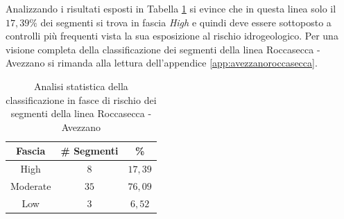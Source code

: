\newline
Analizzando i risultati esposti in Tabella \ref{percentualeavezzanoroccasecca} si evince che in questa linea solo il $17,39\%$ dei segmenti si trova in fascia \textit{High} e quindi deve essere sottoposto a controlli più frequenti vista la sua esposizione al rischio idrogeologico. 
Per una visione completa della classificazione dei segmenti della linea Roccasecca - Avezzano si rimanda alla lettura dell'appendice \ref{app:avezzanoroccasecca}.
\begin{table}[h]
\centering
\begin{tabular}{|c|c|c|}
\hline \rowcolor{lightgray}
Fascia   & \# Segmenti & \%    \\ \hline \rowcolor{flamingopink}
High     & $8$           & $17,39$     \\ \hline \rowcolor{icterine}
Moderate & $35$          & $76,09$ \\ \hline \rowcolor{inchworm}
Low      & $3$          & $6,52$ \\ \hline
\end{tabular}
\caption{Analisi statistica della classificazione in fasce di rischio dei segmenti della linea Roccasecca - Avezzano}
\label{percentualeavezzanoroccasecca}
\end{table}
\newpage
